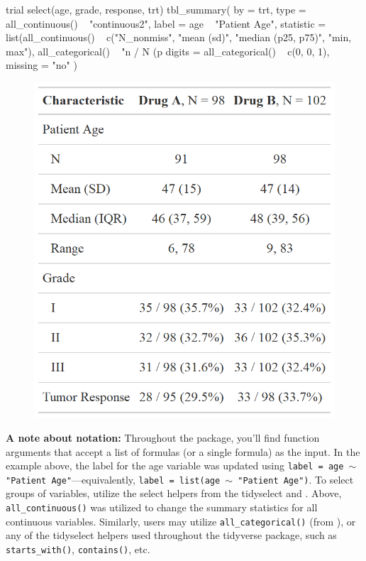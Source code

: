 \begin{example}
trial %
  select(age, grade, response, trt) %
  tbl_summary(
    by = trt,
    type = all_continuous() ~ "continuous2",
    label = age ~ "Patient Age",
    statistic = list(all_continuous() ~ c("{N_nonmiss}", 
                                          "{mean} ({sd})", 
                                          "{median} ({p25}, {p75})", 
                                          "{min}, {max}"),
                     all_categorical() ~ "{n} / {N} ({p}%
    digits = all_categorical() ~ c(0, 0, 1),
    missing = "no"
  )
\end{example}
\begin{figure}[h!]
  \includegraphics[scale=0.28]{summary_plus.png}
  \centering
\end{figure}

\textbf{A note about notation:}
Throughout the  package, you'll find function arguments that accept a list of formulas (or a single formula) as the input.
In the example above, the label for the age variable was updated using \texttt{label = age $\sim$ "Patient Age"}---equivalently, \texttt{label = list(age $\sim$ "Patient Age")}.
To select groups of variables, utilize the select helpers from the tidyselect \citep{tidyselect} and .
Above, \texttt{all\_continuous()} was utilized to change the summary statistics for all continuous variables. 
Similarly, users may utilize \texttt{all\_categorical()} (from ), or any of the tidyselect helpers used throughout the tidyverse \citep{tidyverse} package, such as \texttt{starts\_with()}, \texttt{contains()}, etc.

